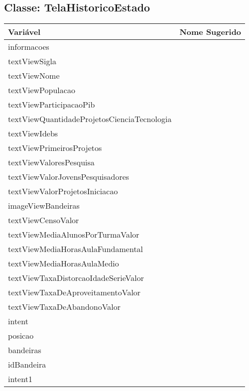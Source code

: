 \documentclass[12pt]{article}
\begin{document}
	\subsection{Classe: TelaHistoricoEstado}
		\begin{table}[H]
			\begin{center}
				\begin{tabular}{l | l}
					\toprule
						Variável & Nome Sugerido\\
					\midrule
						informacoes & \\
						textViewSigla & \\
						textViewNome & \\
						textViewPopulacao & \\
						textViewParticipacaoPib & \\
						textViewQuantidadeProjetosCienciaTecnologia & \\
						textViewIdebs & \\
						textViewPrimeirosProjetos & \\
						textViewValoresPesquisa & \\
						textViewValorJovensPesquisadores & \\
						textViewValorProjetosIniciacao & \\
						imageViewBandeiras & \\
						textViewCensoValor & \\
						textViewMediaAlunosPorTurmaValor & \\
						textViewMediaHorasAulaFundamental & \\
						textViewMediaHorasAulaMedio & \\
						textViewTaxaDistorcaoIdadeSerieValor & \\
						textViewTaxaDeAproveitamentoValor & \\
						textViewTaxaDeAbandonoValor & \\
						intent & \\
						posicao & \\
						bandeiras & \\
						idBandeira & \\
						intent1 & \\
					\bottomrule
				\end{tabular}
			\end{center}
		\end{table}
\end{document}
